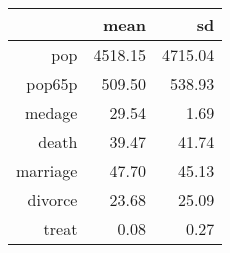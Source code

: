 \begin{table}[ht]
\centering
\begin{tabular}{rrr}
  \toprule
 & mean & sd \\ 
  \midrule
pop & 4518.15 & 4715.04 \\ 
  pop65p & 509.50 & 538.93 \\ 
  medage & 29.54 & 1.69 \\ 
  death & 39.47 & 41.74 \\ 
  marriage & 47.70 & 45.13 \\ 
  divorce & 23.68 & 25.09 \\ 
  treat & 0.08 & 0.27 \\ 
   \bottomrule
\end{tabular}
\end{table}
